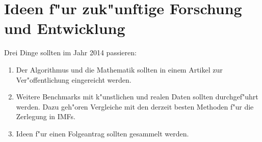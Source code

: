 \documentclass[a4paper]{scrartcl}
\begin{document}
\section{Ideen f"ur zuk"unftige Forschung und Entwicklung}

Drei Dinge sollten im Jahr 2014 passieren:
\begin{enumerate}
  \item Der Algorithmus und die Mathematik sollten in einem Artikel zur Ver"offentlichung eingereicht werden. 
  \item Weitere Benchmarks mit k"unstlichen und realen Daten sollten durchgef"uhrt werden. 
  Dazu geh"oren Vergleiche mit den derzeit besten Methoden f"ur die Zerlegung in IMFs. 
  \item Ideen f"ur einen Folgeantrag sollten gesammelt werden. 
\end{enumerate}




\end{document}
